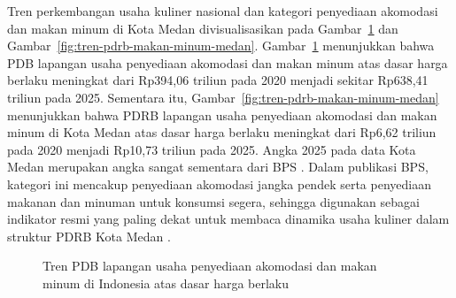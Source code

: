Tren perkembangan usaha kuliner nasional dan kategori penyediaan akomodasi dan makan minum di Kota Medan divisualisasikan pada Gambar~\ref{fig:tren-pdb-makan-minum-indonesia} dan Gambar~\ref{fig:tren-pdrb-makan-minum-medan}. Gambar~\ref{fig:tren-pdb-makan-minum-indonesia} menunjukkan bahwa PDB lapangan usaha penyediaan akomodasi dan makan minum atas dasar harga berlaku meningkat dari Rp394,06 triliun pada 2020 menjadi sekitar Rp638,41 triliun pada 2025. Sementara itu, Gambar~\ref{fig:tren-pdrb-makan-minum-medan} menunjukkan bahwa PDRB lapangan usaha penyediaan akomodasi dan makan minum di Kota Medan atas dasar harga berlaku meningkat dari Rp6,62 triliun pada 2020 menjadi Rp10,73 triliun pada 2025. Angka 2025 pada data Kota Medan merupakan angka sangat sementara dari BPS \parencite{bps2025pendapatan,bps2026ekonomiindonesia,bpsmedan2025pdrb,bpsmedan2026pdrb}. Dalam publikasi BPS, kategori ini mencakup penyediaan akomodasi jangka pendek serta penyediaan makanan dan minuman untuk konsumsi segera, sehingga digunakan sebagai indikator resmi yang paling dekat untuk membaca dinamika usaha kuliner dalam struktur PDRB Kota Medan \parencite{bpsmedan2025pdrb,bpsmedan2026pdrb}.

\begin{figure}[!t]
    \centering
    \caption{Tren PDB lapangan usaha penyediaan akomodasi dan makan minum di Indonesia atas dasar harga berlaku}
    \label{fig:tren-pdb-makan-minum-indonesia}
\end{figure}

